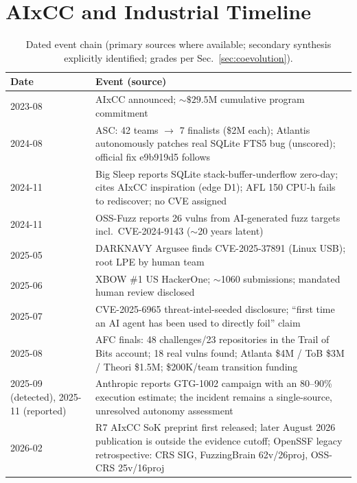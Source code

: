 \documentclass[conference,compsoc]{IEEEtran}
\begin{document}
\section{AIxCC and Industrial Timeline}
\label{app:timeline}
\begin{table}[!ht]
\centering
\small
\caption{Dated event chain (primary sources where available; secondary synthesis explicitly identified; grades per Sec.~\ref{sec:coevolution}).}
\label{tab:timeline}
\begin{tabular}{@{}p{2.0cm}p{15.0cm}@{}}
\toprule
Date & Event (source) \\
\midrule
2023-08 & AIxCC announced; ${\sim}\$29.5$M cumulative program commitment~\cite{darpa2023aixcc} \\
2024-08 & ASC: 42 teams $\rightarrow$ 7 finalists (\$2M each); Atlantis autonomously patches real SQLite FTS5 bug (unscored); official fix e9b919d5 follows~\cite{taasc2024} \\
2024-11 & Big Sleep reports SQLite stack-buffer-underflow zero-day; cites AIxCC inspiration (edge D1); AFL 150 CPU-h fails to rediscover; no CVE assigned~\cite{bigsleep2024}\\
2024-11 & OSS-Fuzz reports 26 vulns from AI-generated fuzz targets incl.\ CVE-2024-9143 (${\sim}$20 years latent)~\cite{ossfuzz-levelingup-2024}\\
2025-05 & DARKNAVY Argusee finds CVE-2025-37891 (Linux USB); root LPE by human team~\cite{darknavyargusee2025}\\
2025-06 & XBOW \#1 US HackerOne; ${\sim}$1060 submissions; mandated human review disclosed~\cite{xbowtop12025}\\
2025-07 & CVE-2025-6965 threat-intel-seeded disclosure; ``first time an AI agent has been used to directly foil'' claim~\cite{bloggoogle2025,nvd6965}\\
2025-08 & AFC finals: 48 challenges/23 repositories in the Trail of Bits account; 18 real vulns found; Atlanta \$4M / ToB \$3M / Theori \$1.5M; \$200K/team transition funding~\cite{darparesults2025,tobbuttercup2025,taafc2025,darpascoring2025}\\
2025-09 (detected), 2025-11 (reported) & Anthropic reports GTG-1002 campaign with an 80--90\% execution estimate; the incident remains a single-source, unresolved autonomy assessment~\cite{anthropicgtg2025,anthropicgtgreport2025}\\
2026-02 & R7 AIxCC SoK preprint first released; later August 2026 publication is outside the evidence cutoff; OpenSSF legacy retrospective: CRS SIG, FuzzingBrain 62v/26proj, OSS-CRS 25v/16proj~\cite{r7sokaixcc2026,openssfaixcc2026}\\
\bottomrule
\end{tabular}
\end{table}
\end{document}
